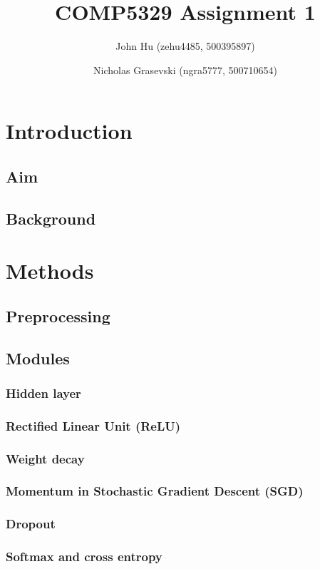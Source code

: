 \documentclass{article}
\title{COMP5329 Assignment 1}
\author{John Hu (zehu4485, 500395897) \and Nicholas Grasevski (ngra5777, 500710654)}
\begin{document}
\maketitle
\begin{abstract}
\end{abstract}

\section{Introduction}
\subsection{Aim}
\subsection{Background}

\section{Methods}
\subsection{Preprocessing}
\subsection{Modules}
\subsubsection{Hidden layer}
\subsubsection{Rectified Linear Unit (ReLU)}
\subsubsection{Weight decay}
\subsubsection{Momentum in Stochastic Gradient Descent (SGD)}
\subsubsection{Dropout}
\subsubsection{Softmax and cross entropy}
\end{document}

